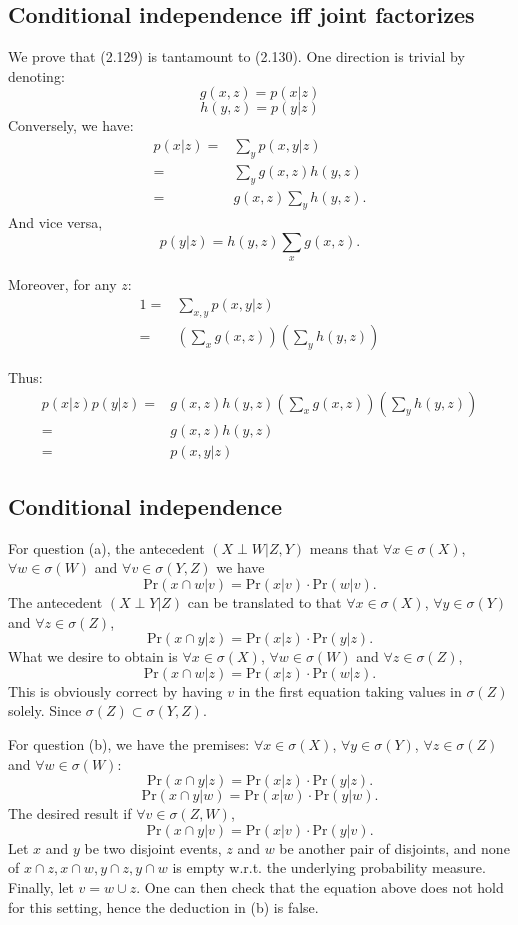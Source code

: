 \documentclass[UTF8]{ctexart}
\begin{document}
\subsection{Conditional independence iff joint factorizes}
We prove that (2.129) is tantamount to (2.130).
One direction is trivial by denoting:
$$g(x,z)=p(x|z)$$
$$h(y,z)=p(y|z)$$
Conversely, we have:
$$
\begin{aligned}
p(x|z)=&\sum_{y}p(x,y|z)  \\
=&\sum_{y}g(x,z)h(y,z)  \\
=&g(x,z)\sum_{y}h(y,z).
\end{aligned}
$$
And vice versa,
$$p(y|z)=h(y,z)\sum_{x}g(x,z).$$

Moreover, for any $z$:
\begin{align}
1=&\sum_{x,y}p(x,y|z) \nonumber \\
=&(\sum_{x}g(x,z))(\sum_{y}h(y,z)) \nonumber
\end{align}

Thus:
\begin{align}
p(x|z)p(y|z)=&g(x,z)h(y,z)(\sum_{x}g(x,z))(\sum_{y}h(y,z)) \nonumber \\
=&g(x,z)h(y,z) \nonumber \\
=&p(x,y|z) \nonumber
\end{align}

\subsection{Conditional independence}
For question (a), the antecedent $(X\perp W|Z,Y)$ means that $\forall x\in\sigma(X)$, $\forall w\in\sigma(W)$ and $\forall v\in\sigma(Y,Z)$ we have
$$\text{Pr}(x\cap w|v)=\text{Pr}(x|v)\cdot\text{Pr}(w|v).$$
The antecedent $(X\perp Y|Z)$ can be translated to that $\forall x\in\sigma(X)$, $\forall y\in\sigma(Y)$ and $\forall z\in\sigma(Z)$,
$$\text{Pr}(x\cap y|z)=\text{Pr}(x|z)\cdot\text{Pr}(y|z).$$
What we desire to obtain is $\forall x\in\sigma(X)$, $\forall w\in\sigma(W)$ and $\forall z\in\sigma(Z)$,
$$\text{Pr}(x\cap w|z)=\text{Pr}(x|z)\cdot\text{Pr}(w|z).$$
This is obviously correct by having $v$ in the first equation taking values in $\sigma(Z)$ solely.
Since $\sigma(Z)\subset \sigma(Y,Z)$.

For question (b), we have the premises: $\forall x\in\sigma(X)$, $\forall y\in\sigma(Y)$, $\forall z \in\sigma(Z)$ and $\forall w\in\sigma(W)$:
$$\text{Pr}(x\cap y|z)=\text{Pr}(x|z)\cdot\text{Pr}(y|z).$$
$$\text{Pr}(x\cap y|w)=\text{Pr}(x|w)\cdot\text{Pr}(y|w).$$
The desired result if $\forall v\in\sigma(Z,W)$,
$$\text{Pr}(x\cap y|v)=\text{Pr}(x|v)\cdot\text{Pr}(y|v).$$
Let $x$ and $y$ be two disjoint events, $z$ and $w$ be another pair of disjoints, and none of $x\cap z,x\cap w, y\cap z,y\cap w$ is empty w.r.t. the underlying probability measure.
Finally, let $v=w\cup z$.
One can then check that the equation above does not hold for this setting, hence the deduction in (b) is false.
\end{document}
